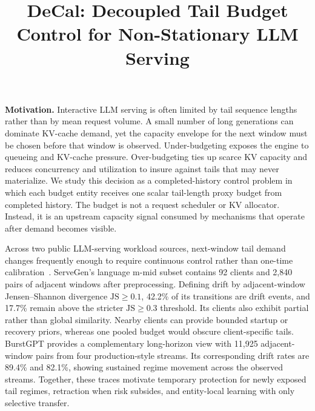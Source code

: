 \documentclass[sigplan,10pt, anonymous]{acmart}
\begin{document}
\pagestyle{plain}

\title{DeCal: Decoupled Tail Budget Control for Non-Stationary LLM Serving}

\maketitle

\noindent\textbf{Motivation.}
Interactive LLM serving is often limited by tail sequence lengths rather than by mean request volume. A small number of long generations can dominate KV-cache demand, yet the capacity envelope for the next window must be chosen before that window is observed. Under-budgeting exposes the engine to queueing and KV-cache pressure. Over-budgeting ties up scarce KV capacity and reduces concurrency and utilization to insure against tails that may never materialize. We study this decision as a completed-history control problem in which each budget entity receives one scalar tail-length proxy budget from completed history. The budget is not a request scheduler or KV allocator. Instead, it is an upstream capacity signal consumed by mechanisms that operate after demand becomes visible.

Across two public LLM-serving workload sources, next-window tail demand changes frequently enough to require continuous control rather than one-time calibration~\cite{Xiang2026NSDI,Wang2025KDD}. ServeGen's language m-mid subset contains 92 clients and 2,840 pairs of adjacent windows after preprocessing. Defining drift by adjacent-window Jensen--Shannon divergence $\mathrm{JS}\ge0.1$, 42.2\% of its transitions are drift events, and 17.7\% remain above the stricter $\mathrm{JS}\ge0.3$ threshold. Its clients also exhibit partial rather than global similarity. Nearby clients can provide bounded startup or recovery priors, whereas one pooled budget would obscure client-specific tails. BurstGPT provides a complementary long-horizon view with 11,925 adjacent-window pairs from four production-style streams. Its corresponding drift rates are 89.4\% and 82.1\%, showing sustained regime movement across the observed streams. Together, these traces motivate temporary protection for newly exposed tail regimes, retraction when risk subsides, and entity-local learning with only selective transfer.
\end{document}
